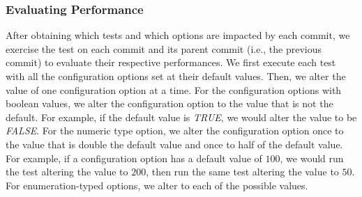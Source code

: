 

\subsubsection{Evaluating Performance}
\label{evaluation}
After obtaining which tests and which options are impacted by each commit, we exercise the test on each commit and its parent commit (i.e., the previous commit) to evaluate their respective performances. %
We first execute each test with all the configuration options set at their default values. Then, we alter the value of one configuration option at a time. For the configuration options with boolean values, we alter the configuration option to the value that is not the default. For example, if the default value is \emph{TRUE}, we would alter the value to be \emph{FALSE}. For the numeric type option, we alter the configuration option once to the value that is double the default value and once to half of the default value. For example, if a configuration option has a default value of $100$, we would run the test altering the value to $200$, then run the same test altering the value to $50$. %
For enumeration-typed options, we alter to each of the possible values.%

